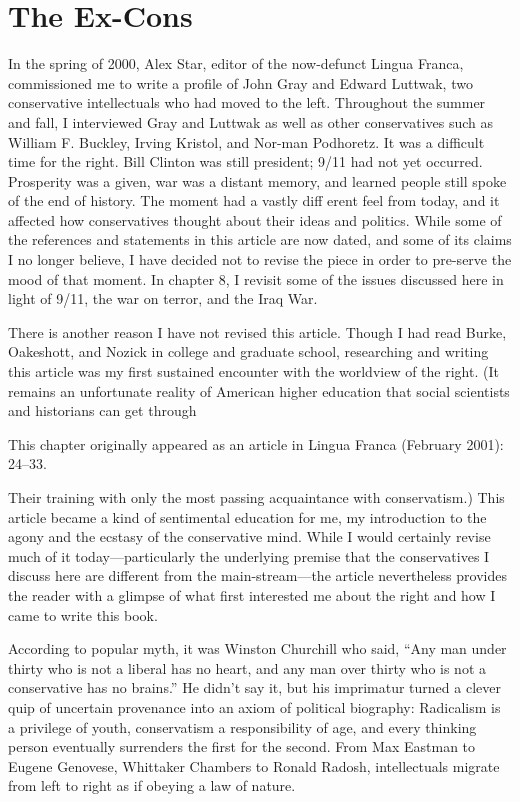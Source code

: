 \chapter{The Ex-Cons}\label{The Ex-Cons}
 \par 
In the spring of 2000, Alex Star, editor of the now-defunct Lingua Franca, commissioned me to write a profile of John Gray and Edward Luttwak, two conservative intellectuals who had moved to the left. Throughout the summer and fall, I interviewed Gray and Luttwak as well as other conservatives such as William F. Buckley, Irving Kristol, and Nor-man Podhoretz. It was a difficult time for the right. Bill Clinton was still president; 9/11 had not yet occurred. Prosperity was a given, war was a distant memory, and learned people still spoke of the end of history. The moment had a vastly diff erent feel from today, and it affected how conservatives thought about their ideas and politics. While some of the references and statements in this article are now dated, and some of its claims I no longer believe, I have decided not to revise the piece in order to pre-serve the mood of that moment. In chapter 8, I revisit some of the issues discussed here in light of 9/11, the war on terror, and the Iraq War.
 \par 
There is another reason I have not revised this article. Though I had read Burke, Oakeshott, and Nozick in college and graduate school, researching and writing this article was my first sustained encounter with the worldview of the right. (It remains an unfortunate reality of American higher education that social scientists and historians can get through
 \par 
This chapter originally appeared as an article in Lingua Franca (February 2001): 24–33.
 \par 
Their training with only the most passing acquaintance with conservatism.) This article became a kind of sentimental education for me, my introduction to the agony and the ecstasy of the conservative mind. While I would certainly revise much of it today—particularly the underlying premise that the conservatives I discuss here are different from the main-stream—the article nevertheless provides the reader with a glimpse of what first interested me about the right and how I came to write this book.
 \par 
According to popular myth, it was Winston Churchill who said, “Any man under thirty who is not a liberal has no heart, and any man over thirty who is not a conservative has no brains.” He didn’t say it, but his imprimatur turned a clever quip of uncertain provenance into an axiom of political biography: Radicalism is a privilege of youth, conservatism a responsibility of age, and every thinking person eventually surrenders the first for the second. From Max Eastman to Eugene Genovese, Whittaker Chambers to Ronald Radosh, intellectuals migrate from left to right as if obeying a law of nature.
